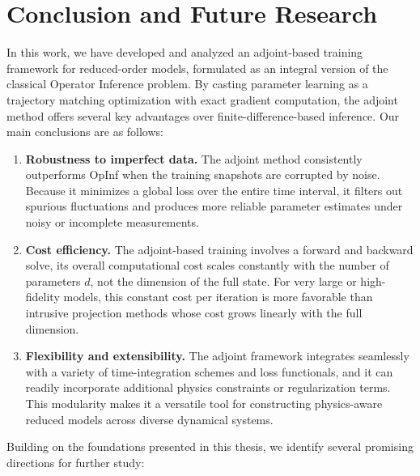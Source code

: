 
\chapter{Conclusion and Future Research}
\label{chap:conclusion}

In this work, we have developed and analyzed an adjoint-based training framework for reduced-order models, formulated as an integral version of the classical Operator Inference problem.  By casting parameter learning as a trajectory matching optimization with exact gradient computation, the adjoint method offers several key advantages over finite-difference-based inference.  Our main conclusions are as follows:

\begin{enumerate}[label=(\roman*)]
  \item \textbf{Robustness to imperfect data.}  
    The adjoint method consistently outperforms OpInf when the training snapshots are corrupted by noise. Because it minimizes a global loss over the entire time interval, it filters out spurious fluctuations and produces more reliable parameter estimates under noisy or incomplete measurements.

  \item \textbf{Cost efficiency.}  
    The adjoint-based training involves a forward and backward solve, its overall computational cost scales constantly with the number of parameters $d$, not the dimension of the full state. For very large or high-fidelity models, this constant cost per iteration is more favorable than intrusive projection methods whose cost grows linearly with the full dimension.

  \item \textbf{Flexibility and extensibility.}  
    The adjoint framework integrates seamlessly with a variety of time-integration schemes and loss functionals, and it can readily incorporate additional physics constraints or regularization terms. This modularity makes it a versatile tool for constructing physics-aware reduced models across diverse dynamical systems.
\end{enumerate}

Building on the foundations presented in this thesis, we identify several promising directions for further study:

